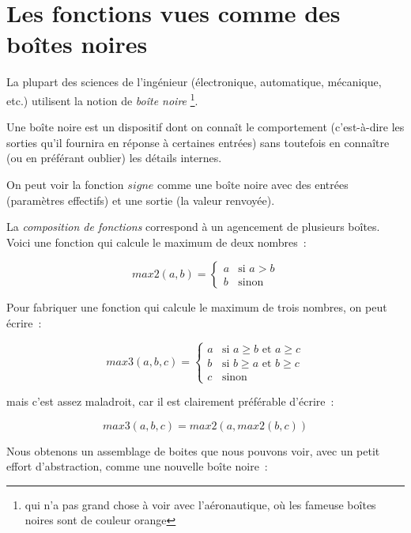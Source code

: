 \section{Les fonctions vues comme des boîtes noires}

La plupart des sciences de l'ingénieur (électronique, automatique, mécanique, etc.) utilisent la notion de {\em  boîte noire}
\footnote{qui n'a pas grand chose à voir avec l'aéronautique, o\`u les fameuse boîtes noires sont de couleur orange}. 

Une boîte noire est un dispositif dont on connaît le comportement (c'est-à-dire les sorties qu'il fournira en réponse à certaines entrées) sans toutefois en connaître (ou en préférant oublier) les détails internes. 

On peut voir la fonction $signe$ comme une boîte noire avec 
des entrées (paramètres effectifs) et une sortie (la valeur renvoyée).

\begin{center}

\end{center}

La {\em composition de fonctions} correspond à un agencement de plusieurs boîtes. Voici une fonction qui calcule le maximum de deux nombres~:


\[	max2 ( a, b ) = \left\{
	\begin{array}{ll}
		a	& \mbox{si $a > b$} \\
		b	& \mbox{sinon} 
	\end{array} \right. \]

Pour fabriquer une fonction qui calcule le maximum de trois nombres, on peut écrire~:

\[	max3 ( a, b, c ) = \left\{
	\begin{array}{ll}
 	a	& \mbox{si $a \geq b$ et $a \geq c$} \\
	b	& \mbox{si $b \geq a$ et $b \geq c$} \\
	c	& \mbox{sinon} 
	\end{array} \right. \]

mais c'est assez maladroit, car il est clairement préférable d'écrire~:

\[ max3 ( a, b, c ) =	max2 ( a, max2 ( b, c ) ) \]

Nous obtenons un assemblage de boites que nous pouvons voir, avec un
petit effort d'abstraction, comme une nouvelle boîte noire~:

\begin{center}

\end{center}

